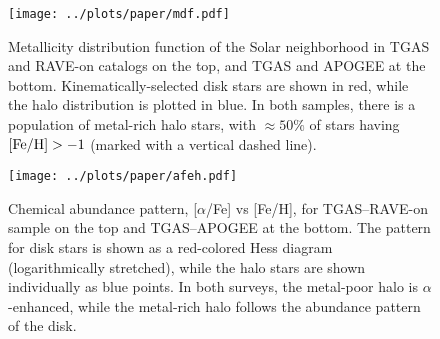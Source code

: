 \documentclass[apj, twocolappendix, numberedappendix, appendixfloats]{emulateapj}
\begin{document}
\begin{figure}
\begin{center}
\texttt{[image: ../plots/paper/mdf.pdf]}
\caption{Metallicity distribution function of the Solar neighborhood in TGAS and RAVE-on catalogs on the top, and TGAS and APOGEE at the bottom.
Kinematically-selected disk stars are shown in red, while the halo distribution is plotted in blue.
In both samples, there is a population of metal-rich halo stars, with $\approx50\%$ of stars having $\rm[Fe/H]>-1$ (marked with a vertical dashed line).}
\label{fig:mdf}
\end{center}
\end{figure}

\begin{figure}
\begin{center}
\texttt{[image: ../plots/paper/afeh.pdf]}
\caption{Chemical abundance pattern, [$\alpha$/Fe] vs [Fe/H], for TGAS--RAVE-on sample on the top and TGAS--APOGEE at the bottom.
The pattern for disk stars is shown as a red-colored Hess diagram (logarithmically stretched), while the halo stars are shown individually as blue points.
In both surveys, the metal-poor halo is $\alpha$-enhanced, while the metal-rich halo follows the abundance pattern of the disk.}
\label{fig:afeh}
\end{center}
\end{figure}
\end{document}
